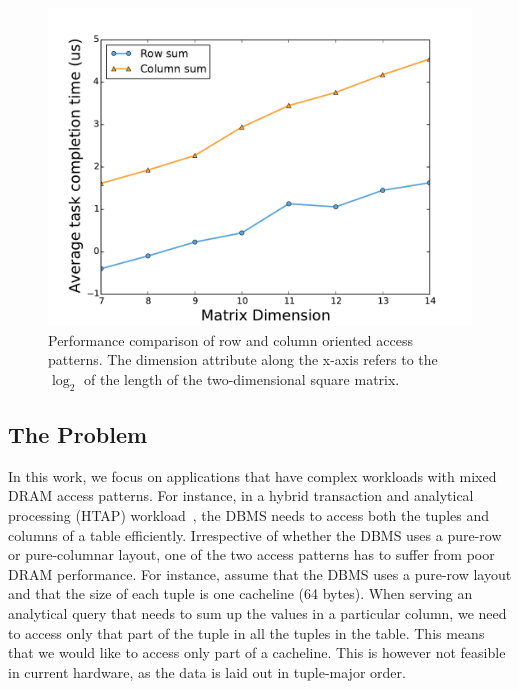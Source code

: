 \documentclass[letterpaper]{article}
\begin{document}
\begin{figure}[ht]
	\centering
	\includegraphics[scale=0.35]{images/rowmajor}
	\caption{Performance comparison of row and column oriented access patterns.
	The dimension attribute along the x-axis refers to the $\log_2$ of
	the length of the two-dimensional square matrix. }
	\label{fig:perf}
\end{figure}

\subsection{The Problem}

In this work, we focus on applications that have complex workloads with
mixed DRAM access patterns. For instance, in a hybrid transaction and
analytical processing (HTAP) workload~\cite{grund10}, the DBMS needs to
access both the tuples and columns of a table efficiently. Irrespective of
whether the DBMS uses a pure-row or pure-columnar layout, one of the two
access patterns has to suffer from poor DRAM performance. For instance, assume
that the DBMS uses a pure-row layout and that the size of each tuple is one
cacheline (64 bytes).
When serving an analytical query that needs to sum up the values in a
particular column, we need to access only that part of the tuple
in all the tuples in the table.
This means that we would like to access only part of a cacheline.
This is however not feasible in current hardware, as the data is laid
out in tuple-major order.
\end{document}
